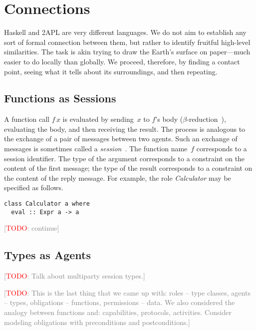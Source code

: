 \documentclass[conference,compsoc]{IEEEtran} %
\newcommand{\todo}[1]{{\small \textcolor{gray}{[\textcolor{red}{TODO}: #1]}}}
\begin{document}
\section{Connections} %

Haskell and 2APL are very different languages. We do not aim to establish
any sort of formal connection between them, but rather to identify fruitful
high-level similarities. The task is akin trying to draw the Earth's
surface on paper---much easier to do locally than globally. We proceed,
therefore, by finding a contact point, seeing what it tells about its
surroundings, and then repeating.

\subsection{Functions as Sessions} %

A function call $f\,x$ is evaluated by sending~$x$ to $f$'s body
($\beta$-reduction~\cite[Chapter~5]{DBLP:books/daglib/0005958}), evaluating
the body, and then receiving the result. The process is analogous to the
exchange of a pair of messages between two agents. Such an exchange of
messages is sometimes called a
\emph{session}~\cite{DBLP:conf/parle/TakeuchiHK94}. The function name~$f$
corresponds to a session identifier. The type of the argument corresponds
to a constraint on the content of the first message; the type of the result
corresponds to a constraint on the content of the reply message. For
example, the role \textit{Calculator} may be specified as follows.
\begin{lstlisting}[style=hs]
class Calculator a where
  eval :: Expr a -> a
\end{lstlisting}
\todo{continue}



\subsection{Types as Agents} %

\todo{Talk about multiparty session types.}

\todo{This is the last thing that we came up with: roles -- type classes, agents -- types, obligations -- functions, permissions -- data. We also considered the analogy between functions and: capabilities, protocols, activities. Consider modeling obligations with preconditions and postconditions.}
\end{document}
